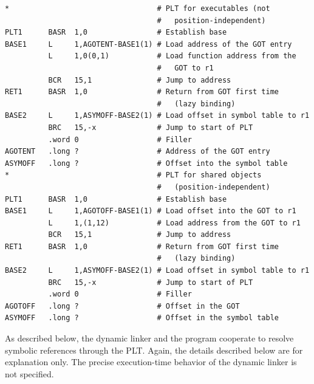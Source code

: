 \documentclass[USenglish,fontsize=11pt,twoside,%
  toc=bib,toc=idx,toc=graduated,numbers=noendperiod,
  bookmarks=true,
  bookmarksnumbered=true,
  bookmarksopen=true,
  bookmarksopenlevel=1,
  breaklinks=true,
  colorlinks=true,
  linkcolor=black,
  pdfpagelayout={TwoPageRight},
  pdfusetitle=true
]{scrreprt}
\begin{document}
\begin{lstlisting}[style=float,language=simpleasm,
  caption=Procedure Linkage Table example,label=lst:pltex]
*                                  # PLT for executables (not
                                   #   position-independent)
PLT1      BASR  1,0                # Establish base
BASE1     L     1,AGOTENT-BASE1(1) # Load address of the GOT entry
          L     1,0(0,1)           # Load function address from the
                                   #   GOT to r1
          BCR   15,1               # Jump to address
RET1      BASR  1,0                # Return from GOT first time
                                   #   (lazy binding)
BASE2     L     1,ASYMOFF-BASE2(1) # Load offset in symbol table to r1
          BRC   15,-x              # Jump to start of PLT
          .word 0                  # Filler
AGOTENT   .long ?                  # Address of the GOT entry
ASYMOFF   .long ?                  # Offset into the symbol table
*                                  # PLT for shared objects
                                   #   (position-independent)
PLT1      BASR  1,0                # Establish base
BASE1     L     1,AGOTOFF-BASE1(1) # Load offset into the GOT to r1
          L     1,(1,12)           # Load address from the GOT to r1
          BCR   15,1               # Jump to address
RET1      BASR  1,0                # Return from GOT first time
                                   #   (lazy binding)
BASE2     L     1,ASYMOFF-BASE2(1) # Load offset in symbol table to r1
          BRC   15,-x              # Jump to start of PLT
          .word 0                  # Filler
AGOTOFF   .long ?                  # Offset in the GOT
ASYMOFF   .long ?                  # Offset in the symbol table
\end{lstlisting}
\fi

As described below, the dynamic linker and the program cooperate to
resolve symbolic references through the PLT\@.  Again, the details
described below are for explanation only.  The precise execution-time
behavior of the dynamic linker is not specified.
\end{document}

